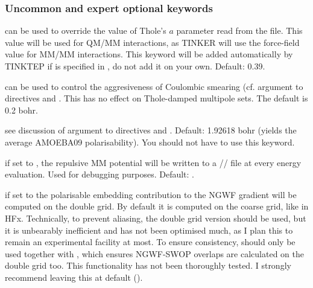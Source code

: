 \documentclass[letterpaper,10pt,english]{sphinxmanual}
\begin{document}
\subsubsection{Uncommon and expert optional keywords}
\label{\detokenize{tinktep:uncommon-and-expert-optional-keywords}}
 \textendash{} can be used to override the value of
Thole’s \(a\) parameter read from the  file. This value will
be used  for QM/MM interactions, as TINKER will use the
force-field value for MM/MM interactions. This keyword will be added
automatically by TINKTEP if  is specified in
, do not add it on your own. Default: 0.39.

 \textendash{} can be used to control the
aggresiveness of Coulombic smearing (cf. 
argument to  directives  and
. This has no effect on Thole-damped multipole
sets. The default is 0.2 bohr.

 \textendash{} see discussion of
 argument to 
directives  and .
Default: 1.92618 bohr (yields the average AMOEBA09 polarisability). You
should not have to use this keyword.

 \textendash{} if set to , the
repulsive MM potential will be written to a //
file at every energy evaluation. Used for debugging purposes. Default:
.

 \textendash{} if set to  the polarisable
embedding contribution to the NGWF gradient will be computed on the
double grid. By default it is computed on the coarse grid, like in HFx.
Technically, to prevent aliasing, the double grid version should be
used, but it is unbearably inefficient and has not been optimised much,
as I plan this to remain an experimental facility at most. To ensure
consistency,  should only be used together with
, which ensures NGWF-SWOP overlaps are calculated on
the double grid too. This functionality has not been thoroughly tested.
I strongly recommend leaving this at default ().
\end{document}
